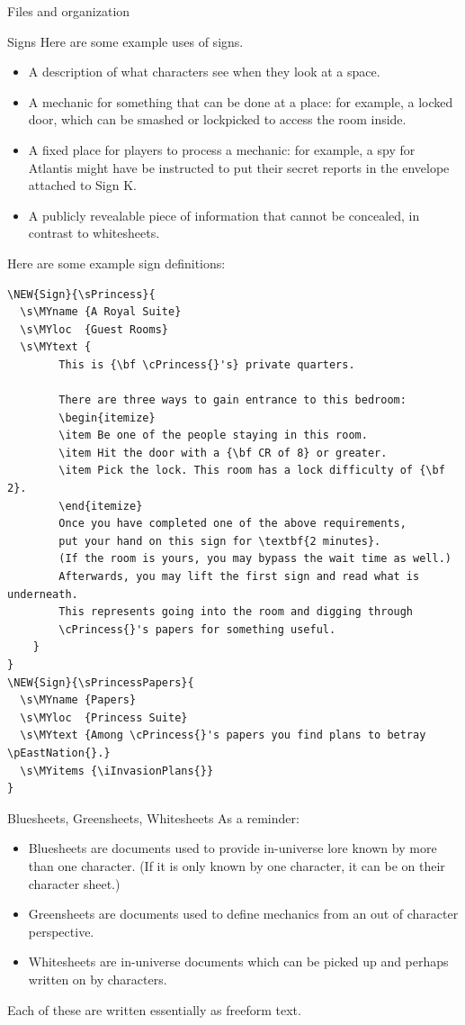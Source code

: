 \documentclass[sheet]{GameTexBase}
\begin{document}
\begin{section}{Files and organization}
\begin{subsection}{Signs}
Here are some example uses of signs.
\begin{itemize}
\item A description of what characters see when they look at a space.
\item A mechanic for something that can be done at a place: for example, a locked door, which can be smashed or lockpicked to access the room inside.
\item A fixed place for players to process a mechanic: for example, a spy for Atlantis might have be instructed to put their secret reports in the envelope attached to Sign K.
\item A publicly revealable piece of information that cannot be concealed, in contrast to whitesheets.
\end{itemize}

Here are some example sign definitions:
\begin{verbatim}
\NEW{Sign}{\sPrincess}{
  \s\MYname	{A Royal Suite}
  \s\MYloc	{Guest Rooms}
  \s\MYtext	{
		This is {\bf \cPrincess{}'s} private quarters.
		
		There are three ways to gain entrance to this bedroom:
		\begin{itemize}
		\item Be one of the people staying in this room. 
		\item Hit the door with a {\bf CR of 8} or greater.
		\item Pick the lock. This room has a lock difficulty of {\bf 2}. 
		\end{itemize}
		Once you have completed one of the above requirements, 
		put your hand on this sign for \textbf{2 minutes}. 
		(If the room is yours, you may bypass the wait time as well.) 
		Afterwards, you may lift the first sign and read what is underneath. 
		This represents going into the room and digging through 
		\cPrincess{}'s papers for something useful.
	}
}
\NEW{Sign}{\sPrincessPapers}{
  \s\MYname	{Papers}
  \s\MYloc	{Princess Suite}
  \s\MYtext	{Among \cPrincess{}'s papers you find plans to betray \pEastNation{}.}
  \s\MYitems {\iInvasionPlans{}}
}
\end{verbatim}

\end{subsection}
\begin{subsection}{Bluesheets, Greensheets, Whitesheets}
\label{sheets}
As a reminder:
\begin{itemize} 
\item Bluesheets are documents used to provide in-universe lore known by more than one character.  (If it is only known by one character, it can be on their character sheet.)
\item Greensheets are documents used to define mechanics from an out of character perspective.
\item Whitesheets are in-universe documents which can be picked up and perhaps written on by characters.
\end{itemize}
Each of these are written essentially as freeform text.


\end{subsection}
\end{section}
\end{document}
